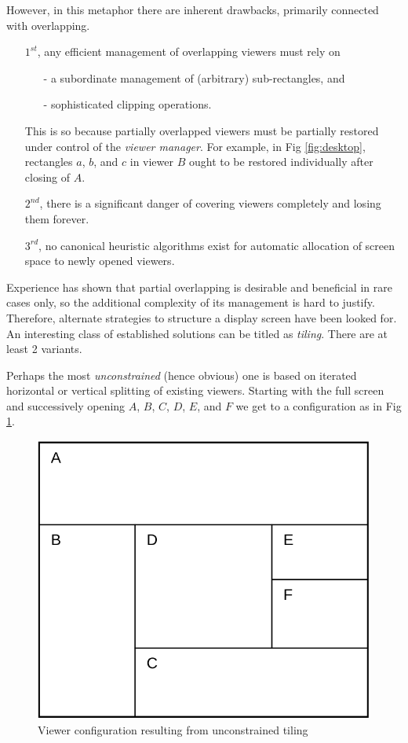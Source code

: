 However, in this metaphor there are inherent drawbacks, primarily connected with overlapping.
\begin{itemize}
  \item[$1^{st}$,] any efficient management of overlapping viewers must rely on
    \begin{itemize}
      \item[-] a subordinate management of (arbitrary) sub-rectangles, and
      \item[-] sophisticated clipping operations.
    \end{itemize}
    This is so because partially overlapped viewers must be partially restored under control
    of the \emph{viewer manager}. For example, in Fig \ref{fig:desktop}, rectangles $a$, $b$,
    and $c$ in viewer $B$ ought to be restored individually after closing of $A$.
  \item[$2^{nd}$,] there is a significant danger of covering viewers completely and losing them forever.
  \item[$3^{rd}$,] no canonical heuristic algorithms exist for automatic allocation
    of screen space to newly opened viewers.
\end{itemize}

Experience has shown that partial overlapping is desirable and beneficial in rare cases only,
so the additional complexity of its management is hard to justify. \cite{Binding, Wille}
Therefore, alternate strategies to structure a display screen have been looked for.
An interesting class of established solutions can be titled as \emph{tiling}.
There are at least 2 variants. \cite{Cohen}

Perhaps the most \emph{unconstrained} (hence obvious) one is based on iterated horizontal
or vertical splitting of existing viewers. Starting with the full screen and successively
opening $A$, $B$, $C$, $D$, $E$, and $F$ we get to a configuration as in Fig \ref{fig:tiling}.
\begin{figure}[h!]
  \centering
  \includegraphics[width=.6\textwidth]{i/5}
  \caption{Viewer configuration resulting from unconstrained tiling}
  \label{fig:tiling}
\end{figure}

